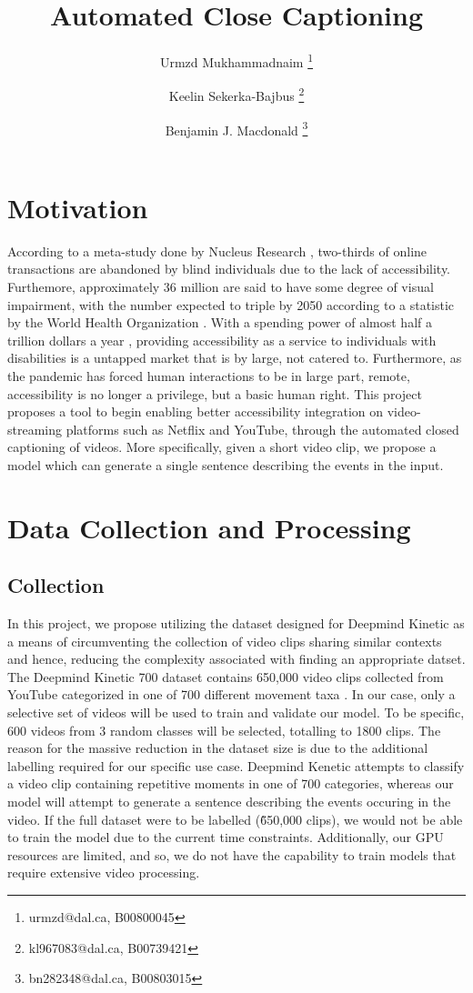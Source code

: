 \documentclass[11pt]{article}
\title{Automated Close Captioning}
\author[1]{Urmzd Mukhammadnaim \thanks{urmzd@dal.ca, B00800045}}
\author[1]{Keelin Sekerka-Bajbus \thanks{kl967083@dal.ca, B00739421 }}
\author[1]{Benjamin J. Macdonald \thanks{bn282348@dal.ca, B00803015}}
\affil[1]{Faculty of Computer Science, Dalhousie University}
\begin{document}
\maketitle

\section{Motivation}
According to a meta-study done by Nucleus Research \cite{nucleus research_2019}, two-thirds
of online transactions are abandoned by blind individuals due to the lack of accessibility.
Furthemore, approximately 36 million are said to have some degree of visual impairment, with the number
expected to triple by 2050 according to a statistic by the World Health Organization \cite{world health organization_2021}.
With a spending power of almost half a trillion dollars a year \cite{yin_smith_overton_shaewitz_2018}, providing accessibility
as a service to individuals with disabilities is a untapped market that is by large, not catered to.
Furthermore, as the pandemic has forced human interactions to be in large part, remote, accessibility is no longer
a privilege, but a basic human right. This project proposes a tool to begin enabling better accessibility
integration on video-streaming platforms such as Netflix and YouTube, through the automated
closed captioning of videos. More specifically, given a short video clip, we propose a model which
can generate a single sentence describing the events in the input.

\newpage
\section{Data Collection and Processing}
\subsection{Collection}
In this project, we propose utilizing the dataset designed for Deepmind Kinetic as a means of
circumventing the collection of video clips sharing similar contexts and hence, reducing the complexity associated
with finding an appropriate datset. The Deepmind Kinetic 700 dataset contains 650,000 video clips collected from YouTube
categorized in one of 700 different movement taxa \cite{DBLP:journals/corr/abs-2010-10864}. In our case, only a selective set of videos will be used to train and validate
our model. To be specific, 600 videos from 3 random classes will be selected, totalling
to 1800 clips. The reason for the massive reduction in the dataset size is due to the additional labelling
required for our specific use case. Deepmind Kenetic attempts to classify a video clip containing repetitive moments
in one of 700 categories, whereas our model will attempt to generate a sentence describing the events occuring in the video.
If the full dataset were to be labelled (\~650,000 clips), we would not be able to train the model due to the current time
constraints. Additionally, our GPU resources are limited, and so, we do not have the capability to train models
that require extensive video processing.
\end{document}
